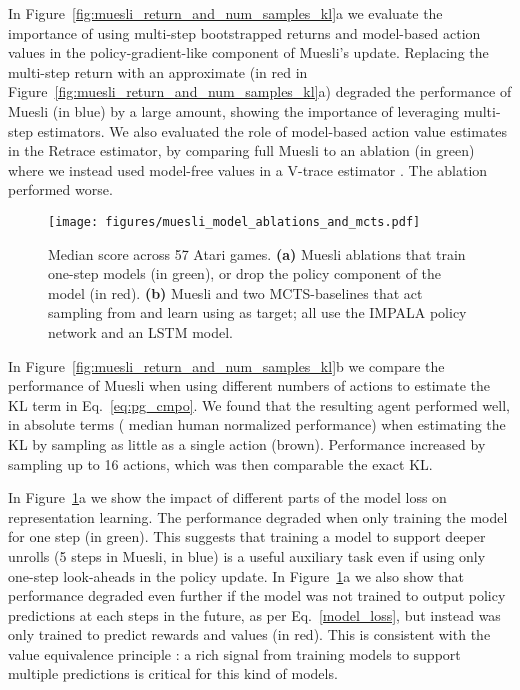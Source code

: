 \documentclass{article}
\begin{document}
In Figure~\ref{fig:muesli_return_and_num_samples_kl}a we evaluate the importance of using multi-step bootstrapped returns and model-based action values in the policy-gradient-like component of Muesli's update. Replacing the multi-step return with an approximate  (in red in Figure~\ref{fig:muesli_return_and_num_samples_kl}a) degraded the performance of Muesli (in blue) by a large amount, showing the importance of leveraging multi-step estimators. We also evaluated the role of model-based action value estimates  in the Retrace estimator, by comparing full Muesli to an ablation (in green) where we instead used model-free values  in a V-trace estimator \cite{espeholt2018impala}. The ablation performed worse.

\begin{figure}[t]
\begin{center}
\centerline{\texttt{[image: figures/muesli\_model\_ablations\_and\_mcts.pdf]}}
\vskip -0.05in
\caption{Median score across 57 Atari games. \textbf{(a)} Muesli ablations that train one-step models (in green), or drop the policy component of the model (in red).
\textbf{(b)} Muesli and two MCTS-baselines that act sampling from  and learn using  as target; all use the IMPALA policy network and an LSTM model.}
\label{fig:muesli_model_ablations_and_mcts}
\end{center}
\vskip -0.42in
\end{figure}

In Figure~\ref{fig:muesli_return_and_num_samples_kl}b we compare the performance of Muesli when using different numbers of actions to estimate the KL term in Eq.~\ref{eq:pg_cmpo}. We found that the resulting agent performed well, in absolute terms ( median human normalized performance) when estimating the KL by sampling as little as a single action (brown). Performance increased by sampling up to 16 actions, which was then comparable the exact KL.

In Figure~\ref{fig:muesli_model_ablations_and_mcts}a we show the impact of different parts of the model loss on representation learning. The performance degraded when only training the model for one step (in green). This suggests that training a model to support deeper unrolls (5 steps in Muesli, in blue) is a useful auxiliary task even if using only one-step look-aheads in the policy update. In  Figure~\ref{fig:muesli_model_ablations_and_mcts}a we also show that performance degraded even further if the model was not trained to output policy predictions at each steps in the future, as per Eq.~\ref{model_loss}, but instead was only trained to predict rewards and values (in red). This is consistent with the value equivalence principle \cite{grimm2020value}: a rich signal from training models to support multiple predictions is critical for this kind of models.
\end{document}
